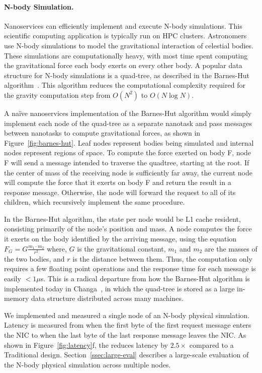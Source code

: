 \paragraph{N-body Simulation.} Nanoservices can efficiently implement and execute N-body simulations.
This scientific computing application is typically run on HPC clusters. 
Astronomers use N-body simulations to model the gravitational interaction of celestial bodies.
These simulations are computationally heavy, with most time spent computing the gravitational force each body exerts on every other body.
A popular data structure for N-body simulations is a quad-tree, as described in the Barnes-Hut algorithm~\cite{barnes-hut}. 
This algorithm reduces the computational complexity required for the gravity computation step from $O(N^2)$ to $O(N \log N)$.

A na\"ive nanoservices implementation of the Barnes-Hut algorithm would simply implement each node of the quad-tree as a separate nanotask and pass messages between nanotasks to compute gravitational forces, as shown in Figure~\ref{fig:barnes-hut}. 
Leaf nodes represent bodies being simulated and internal nodes represent regions of space. 
To compute the force exerted on body F, node F will send a message intended to traverse the quadtree, starting at the root. 
If the center of mass of the receiving node is sufficiently far away, the current node will compute the force that it exerts on body F and return the result in a response message. 
Otherwise, the node will forward the request to all of its children, which recursively implement the same procedure.

In the Barnes-Hut algorithm, the state per node would be L1 cache resident, consisting primarily of the node's position and mass.
A node computes the force it exerts on the body identified by the arriving message, using the equation
 $F_G = G\frac{m_1 \cdot m_2}{r^2} $
where, $G$ is the gravitational constant, $m_1$ and $m_2$ are the masses of the two bodies, and $r$ is the distance between them.
Thus, the computation only requires a few floating point operations and the response time for each message is easily $<1\mu$s. 
This is a radical departure from how the Barnes-Hut algorithm is implemented today in Changa~\cite{changa}, in which the quad-tree is stored as a large in-memory data structure distributed across many machines.

We implemented and measured a single node of an N-body physical simulation. Latency is measured from when the first byte of the first request message enters the NIC to when the last byte of the last response message leaves the NIC.
As shown in Figure~\ref{fig:latency}f, the \name{} reduces latency by $2.5\times$ compared to a Traditional design. 
Section~\ref{ssec:large-eval} describes a large-scale evaluation of the N-body physical simulation across multiple nodes. 

